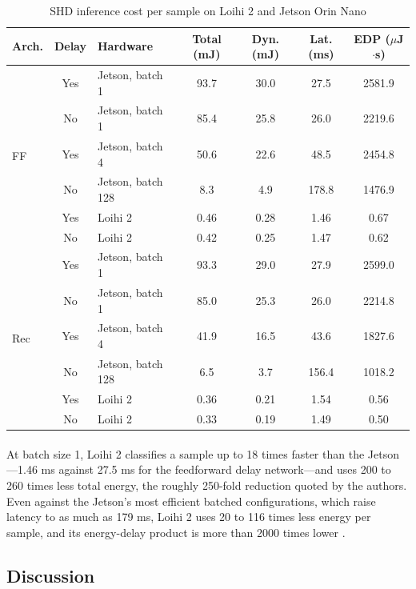 \documentclass[12pt,a4paper,final]{extreport}
\begin{document}
{\renewcommand{\arraystretch}{1.12}
\begin{table}[htbp]
\centering
\caption{SHD inference cost per sample on Loihi 2 and Jetson Orin Nano \cite{p1}}\label{tab:p1_energy}
\small
\setlength{\tabcolsep}{4pt}
\begin{tabular}{|l|c|l|c|c|c|c|}
\hline
\textbf{Arch.} & \textbf{Delay} & \textbf{Hardware} & \textbf{Total (mJ)} & \textbf{Dyn. (mJ)} & \textbf{Lat. (ms)} & \textbf{EDP ($\mu$J$\cdot$s)} \\ \hline
\multirow{6}{*}{FF} & Yes & Jetson, batch 1 & 93.7 & 30.0 & 27.5 & 2581.9 \\
 & No & Jetson, batch 1 & 85.4 & 25.8 & 26.0 & 2219.6 \\
 & Yes & Jetson, batch 4 & 50.6 & 22.6 & 48.5 & 2454.8 \\
 & No & Jetson, batch 128 & 8.3 & 4.9 & 178.8 & 1476.9 \\
 & Yes & Loihi 2 & 0.46 & 0.28 & 1.46 & 0.67 \\
 & No & Loihi 2 & 0.42 & 0.25 & 1.47 & 0.62 \\ \hline
\multirow{6}{*}{Rec} & Yes & Jetson, batch 1 & 93.3 & 29.0 & 27.9 & 2599.0 \\
 & No & Jetson, batch 1 & 85.0 & 25.3 & 26.0 & 2214.8 \\
 & Yes & Jetson, batch 4 & 41.9 & 16.5 & 43.6 & 1827.6 \\
 & No & Jetson, batch 128 & 6.5 & 3.7 & 156.4 & 1018.2 \\
 & Yes & Loihi 2 & 0.36 & 0.21 & 1.54 & 0.56 \\
 & No & Loihi 2 & 0.33 & 0.19 & 1.49 & 0.50 \\ \hline
\end{tabular}
\end{table}}

\paragraph{} At batch size 1, Loihi 2 classifies a sample up to 18 times faster than the Jetson---1.46 ms against 27.5 ms for the feedforward delay network---and uses 200 to 260 times less total energy, the roughly 250-fold reduction quoted by the authors. Even against the Jetson's most efficient batched configurations, which raise latency to as much as 179 ms, Loihi 2 uses 20 to 116 times less energy per sample, and its energy-delay product is more than 2000 times lower \cite{p1}.

\subsection{Discussion}
\end{document}
